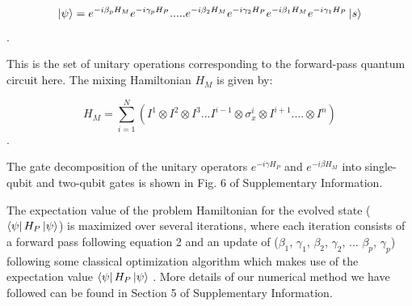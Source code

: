 \documentclass[10pt]{article}
\begin{document}
\begin{equation}
    \ket{\psi}=e^{-i\beta_pH_M}e^{-i\gamma_pH_P}.....
    e^{-i\beta_2H_M}e^{-i\gamma_2H_P}e^{-i\beta_1H_M}e^{-i\gamma_1H_P} \ket{s}
    \label{QAOA_evol}
\end{equation}.

This is the set of unitary operations corresponding to the forward-pass quantum circuit here. The mixing Hamiltonian $H_M$ is given by: 

\begin{equation}
H_M=\sum _{i=1}^{N}(I^{1}\otimes I^{2} \otimes I^{3}...I^{i-1} \otimes \sigma _{x}^{i}\otimes I^{i+1}....\otimes I^{n})
\label{QAOA_Hm}
\end{equation}.

The gate decomposition of the unitary operators $e^{-i\gamma H_P}$ and $e^{-i\beta H_M}$ into single-qubit and two-qubit gates is shown in Fig. 6 of Supplementary Information. 



The expectation value of the problem Hamiltonian for the evolved state ($\bra{\psi}H_P\ket{\psi}$) is maximized over several iterations, where each iteration consists of a forward pass following equation 2 and an update of ($\beta_1$, $\gamma_1$, $\beta_2$, $\gamma_2$, ... $\beta_p$, $\gamma_p$) following some classical optimization algorithm which makes use of the expectation value $\bra{\psi}H_P\ket{\psi}$ \cite{QAOA_Farhi,QAOA_Tutorial}. More details of our numerical method we have followed can be found in Section 5 of Supplementary Information. 

 
\end{document}
